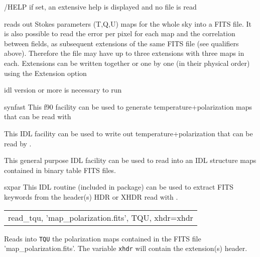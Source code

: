 \begin{keywords}
  \begin{kwlist}{} %
	\item[{/HELP}] if set, an extensive help is displayed and no
	file is read
   \end{kwlist}
\end{keywords}

\begin{codedescription}
{\thedocid { }reads out Stokes parameters (T,Q,U) maps for the whole
sky into a FITS file. It is also possible to read the error per pixel for each
map and the correlation between fields, as subsequent extensions of the same FITS
file (see qualifiers above). Therefore the file may have up to three extensions with three
maps in each. Extensions can be written together or one by one (in
their physical order) using the Extension option}
\end{codedescription}



\begin{related}
  \begin{sulist}{} %
  \item[idl] version \idlversion or more is necessary to run \thedocid
  \item[synfast] This \healpix f90 facility can be used to generate
  temperature+polarization maps that can be read with \thedocid
  \item[\htmlref{write\_tqu}{idl:write_tqu}] This \healpix IDL facility can be used to write
  out temperature+polarization that can be read by \thedocid.

  \item[\htmlref{read\_fits\_s}{idl:read_fits_s}] This general purpose \healpix IDL facility can be used to read
  into an IDL structure maps contained in binary table FITS files.
  \item[sxpar] This IDL routine (included in \healpix package) can be
  used to extract FITS keywords from the header(s) HDR or XHDR read with \thedocid.
  \end{sulist}
\end{related}


\begin{example}
{
\begin{tabular}{l} %
read\_tqu, 'map\_polarization.fits', TQU, xhdr=xhdr\\
\end{tabular}
}
{
Reads into {\tt TQU} the polarization maps contained in the FITS file
'map\_polarization.fits'.
The variable {\tt xhdr} will contain the extension(s) header.
}
\end{example}

